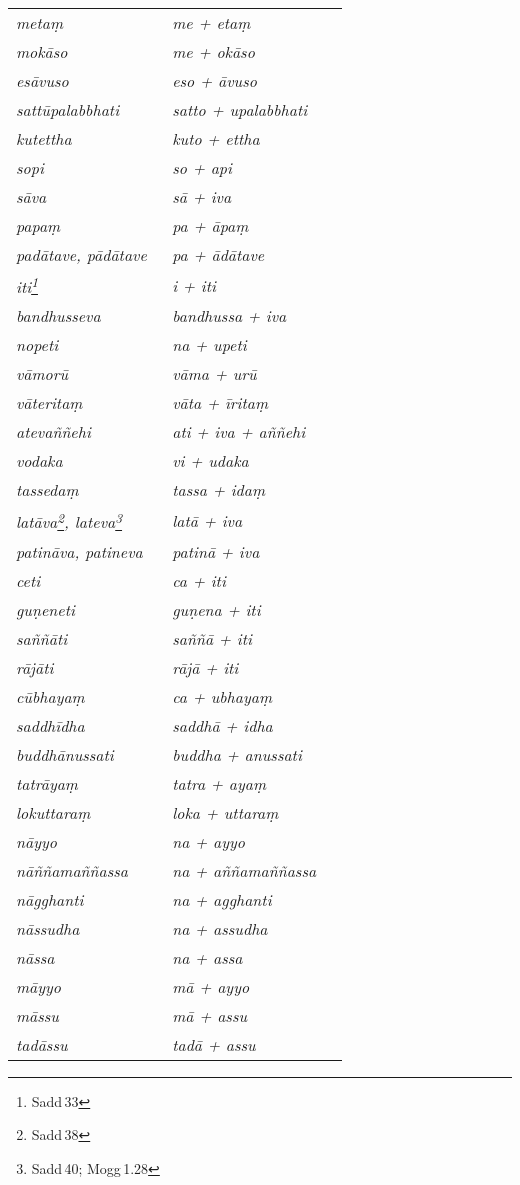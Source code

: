 \begin{longtable}[c]{@{}>{\itshape}p{0.44\linewidth}%
	>{\itshape}p{0.5\linewidth}@{}}
meta\d m & me + eta\d m \\
mok\=aso & me + ok\=aso \\
es\=avuso & eso + \=avuso \\
satt\=upalabbhati & satto + upalabbhati \\
kutettha & kuto + ettha \\
sopi & so + api \\
s\=ava & s\=a + iva \\
papa\d m & pa + \=apa\d m \\
pad\=atave, p\=ad\=atave & pa + \=ad\=atave \\
iti\footnote{Sadd\,33} & i + iti \\
bandhusseva & bandhussa + iva \\
nopeti & na + upeti \\
v\=amor\=u & v\=ama + ur\=u \\
v\=aterita\d m & v\=ata + \=irita\d m \\
ateva\~n\~nehi & ati + iva + a\~n\~nehi \\
vodaka & vi + udaka \\
tasseda\d m & tassa + ida\d m \\
lat\=ava\footnote{Sadd\,38}, lateva\footnote{Sadd\,40; Mogg\,1.28} & lat\=a + iva \\
patin\=ava, patineva & patin\=a + iva \\
ceti & ca + iti \\
gu\d neneti & gu\d nena + iti \\
sa\~n\~n\=ati & sa\~n\~n\=a + iti \\
r\=aj\=ati & r\=aj\=a + iti \\
c\=ubhaya\d m & ca + ubhaya\d m \\
saddh\=idha & saddh\=a + idha \\
buddh\=anussati & buddha + anussati \\
tatr\=aya\d m & tatra + aya\d m \\
lokuttara\d m & loka + uttara\d m \\
n\=ayyo & na + ayyo \\
n\=a\~n\~nama\~n\~nassa & na + a\~n\~nama\~n\~nassa \\
n\=agghanti & na + agghanti \\
n\=assudha & na + assudha \\
n\=assa & na + assa \\
m\=ayyo & m\=a + ayyo \\
m\=assu & m\=a + assu \\
tad\=assu & tad\=a + assu \\

\end{longtable}
